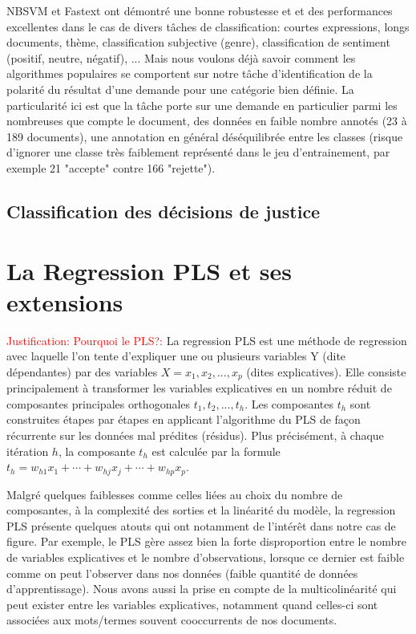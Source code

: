 NBSVM et Fastext ont démontré une bonne robustesse et et des performances excellentes dans le cas de divers tâches de classification: courtes expressions, longs documents, thème, classification subjective (genre), classification de sentiment (positif, neutre, négatif), ... Mais nous voulons déjà savoir comment les algorithmes populaires se comportent sur notre tâche d'identification de la polarité du résultat d'une demande pour une catégorie bien définie. La particularité ici est que la tâche porte sur une demande en particulier parmi les nombreuses que compte le document, des données en faible nombre annotés (23 à 189 documents), une annotation en général déséquilibrée entre les classes (risque d'ignorer une classe très faiblement représenté dans le jeu d'entrainement, par exemple 21 "accepte" contre 166 "rejette").

\subsection{Classification des décisions de justice}

\section{La Regression PLS et ses extensions}
\label{sec:sensresultat:pls}
\textcolor{red}{Justification: Pourquoi le PLS?:}
La regression PLS est une méthode de regression avec laquelle l'on tente d'expliquer une ou plusieurs variables Y (dite dépendantes) par des variables $X=x_1,x_2,...,x_p$ (dites explicatives). Elle consiste principalement à transformer les variables explicatives en un nombre réduit de composantes principales orthogonales $t_1, t_2, ..., t_h$. Les composantes $t_h$ sont construites étapes par étapes en applicant l'algorithme du PLS de façon récurrente sur les données mal prédites (résidus). Plus précisément, à chaque itération $h$, la composante $t_h$ est calculée par la formule $t_h = w_{h1} x_1 + \cdots + w_{hj} x_j + \cdots + w_{hp} x_p$. 

Malgré quelques faiblesses comme celles liées au choix du nombre de composantes, à la complexité des sorties et la linéarité du modèle, la regression PLS présente quelques atouts qui ont notamment de l'intérêt dans notre cas de figure. Par exemple, le PLS gère assez bien la forte disproportion entre le nombre de variables explicatives et le nombre d'observations, lorsque ce dernier est faible comme on peut l'observer dans nos données (faible quantité de données d'apprentissage). Nous avons aussi la prise en compte de la multicolinéarité qui peut exister entre les variables explicatives, notamment quand celles-ci sont associées aux mots/termes souvent cooccurrents de nos documents.

